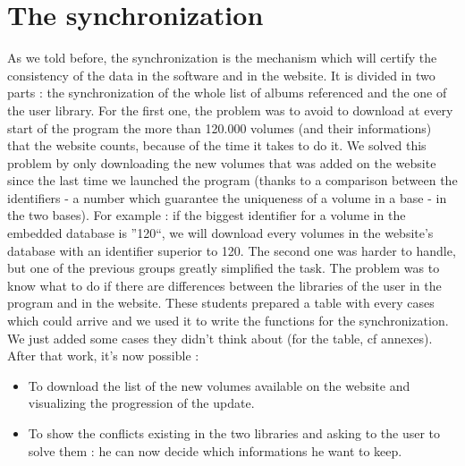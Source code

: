 \documentclass[11pt]{report} %
\begin{document}
\section{The synchronization}
As we told before, the synchronization is the mechanism which will certify the consistency of the data in the software and in the website. It is divided in two parts : the synchronization of the whole list of albums referenced and the one of the user library.
\newline For the first one, the problem was to avoid to download at every start of the program the more than 120.000 volumes (and their informations) that the website counts, because of the time it takes to do it. We solved this problem by only downloading the new volumes that was added on the website since the last time we launched the program (thanks to a comparison between the identifiers - a number which guarantee the uniqueness of a volume in a base - in the two bases).
\newline For example : if the biggest identifier for a volume in the embedded database is ''120``, we will download every volumes in the website's database with an identifier superior to 120.
\newline The second one was harder to handle, but one of the previous groups greatly simplified the task. The problem was to know what to do if there are differences between the libraries of the user in the program and in the website. These students prepared a table with every cases which could arrive and we used it to write the functions for the synchronization. We just added some cases they didn't think about (for the table, cf annexes).
\newline After that work, it's now possible :
\begin{itemize}
\item To download the list of the new volumes available on the website and visualizing the progression of the update.
\item To show the conflicts existing in the two libraries and asking to the user to solve them : he can now decide which informations he want to keep.
\end{itemize}

\end{document}
